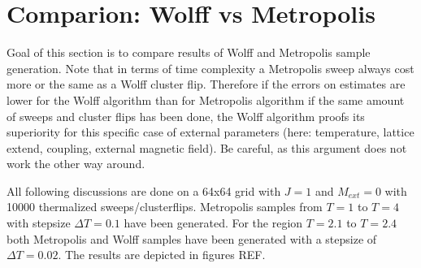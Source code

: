 \documentclass[11pt, a4paper]{scrartcl}
\begin{document}
\section{Comparion: Wolff vs Metropolis}
    Goal of this section is to compare results of Wolff and Metropolis sample generation. Note that in terms of time complexity a Metropolis sweep always cost more or the same as a Wolff cluster flip. Therefore if the errors on estimates are lower for the Wolff algorithm than for Metropolis algorithm if the same amount of sweeps and cluster flips has been done, the Wolff algorithm proofs its superiority for this specific case of external parameters (here: temperature, lattice extend, coupling, external magnetic field). Be careful, as this argument does not work the other way around.

    All following discussions are done on a 64x64 grid with $J = 1$ and $M_{ext} = 0$ with 10000 thermalized sweeps/clusterflips. Metropolis samples from $T = 1$ to $T = 4$ with stepsize $\Delta T = 0.1$ have been generated. For the region $T = 2.1$ to $T = 2.4$ both Metropolis and Wolff samples have been generated with a stepsize of $\Delta T = 0.02$. The results are depicted in figures REF.
\end{document}
